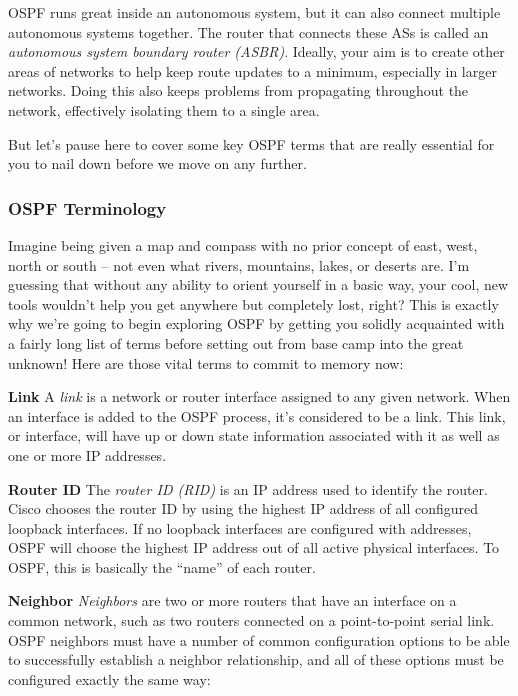 OSPF runs great inside an autonomous system, but it can also connect
multiple autonomous systems together. The router that connects these ASs
is called an \emph{autonomous system boundary router (ASBR)}. Ideally,
your aim is to create other areas of networks to help keep route updates
to a minimum, especially in larger networks. Doing this also keeps
problems from propagating throughout the network, effectively isolating
them to a single area.

But let's pause here to cover some key OSPF terms that are really
essential for you to nail down before we move on any further.

\subsubsection[OSPF
Terminology]{\texorpdfstring{\protect\hypertarget{c18.xhtmlux5cux23c18-sec-2}{}{}\protect\hypertarget{c18.xhtmlux5cux23Page_749}{}{}OSPF
Terminology}{OSPF Terminology}}

Imagine being given a map and compass with no prior concept of east,
west, north or south -- not even what rivers, mountains, lakes, or
deserts are. I'm guessing that without any ability to orient yourself in
a basic way, your cool, new tools wouldn't help you get anywhere but
completely lost, right? This is exactly why we're going to begin
exploring OSPF by getting you solidly acquainted with a fairly long list
of terms before setting out from base camp into the great unknown! Here
are those vital terms to commit to memory now:

\textbf{Link} A \emph{link} is a network or router interface assigned to
any given network. When an interface is added to the OSPF process, it's
considered to be a link. This link, or interface, will have up or down
state information associated with it as well as one or more IP
addresses.

\textbf{Router ID} The \emph{router ID (RID)} is an IP address used to
identify the router. Cisco chooses the router ID by using the highest IP
address of all configured loopback interfaces. If no loopback interfaces
are configured with addresses, OSPF will choose the highest IP address
out of all active physical interfaces. To OSPF, this is basically the
``name'' of each router.

\textbf{Neighbor} \emph{Neighbors} are two or more routers that have an
interface on a common network, such as two routers connected on a
point-to-point serial link. OSPF neighbors must have a number of common
configuration options to be able to successfully establish a neighbor
relationship, and all of these options must be configured exactly the
same way:

